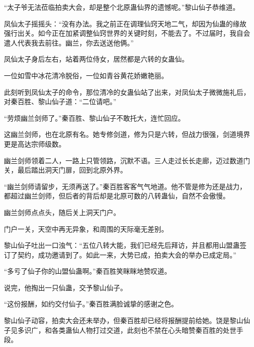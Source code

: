 \begin{this_body}
“太子爷无法莅临拍卖大会，却是整个北原蛊仙界的遗憾呢。”黎山仙子恭维道。

凤仙太子摇摇头：“没有办法。我之前正在调理仙窍天地二气，却因为仙蛊的缘故强行出关。如今正在加紧调整仙窍世界的关键时刻，不能去了。不过届时，我自会遣人代表我去前往。幽兰，你去送送他俩。”

凤仙太子身后左右，站着两位侍女，居然都是六转的女蛊仙。

一位如雪中冰花清冷脱俗，一位如青谷黄花娇嫩艳丽。

此刻听到凤仙太子的命令，那位清冷的女蛊仙站了出来，对凤仙太子微微施礼后，对秦百胜、黎山仙子道：“二位请吧。”

“劳烦幽兰剑师了。”秦百胜、黎山仙子不敢托大，连忙回应。

这幽兰剑师，也在北原有名。她专修剑道，修为只是六转，但战力很强，剑道境界更是高达宗师级数。

幽兰剑师领着二人，一路上只管领路，沉默不语。三人走过长长走廊，迈过数道门关，最后踏出洞天门扉，回到北原外界。

“幽兰剑师请留步，无须再送了。”秦百胜客客气气地道。他不管是修为还是战力，都超过幽兰剑师，但后者的背后却是北原可数的八转蛊仙，自然不会傲慢。

幽兰剑师点点头，随后关上洞天门户。

门户一关，天空中再无异象，和周围的天际毫无差别。

黎山仙子吐出一口浊气：“五位八转大能，我们已经先后拜访，并且都用山盟蛊签订了契约，成功邀请到了。如此一来，大势已成，拍卖大会的举办已成定局。”

“多亏了仙子你的山盟仙蛊啊。”秦百胜笑眯眯地赞叹道。

说完，他掏出一只仙蛊，交予黎山仙子。

“这份报酬，如约交付仙子。”秦百胜满脸诚挚的感谢之色。

黎山仙子动容，拍卖大会还未举办，但秦百胜却已经将报酬提前给她。饶是黎山仙子见多识广，和各类蛊仙人物打过交道，此刻也不禁在心头暗赞秦百胜的处世手段。

\end{this_body}

